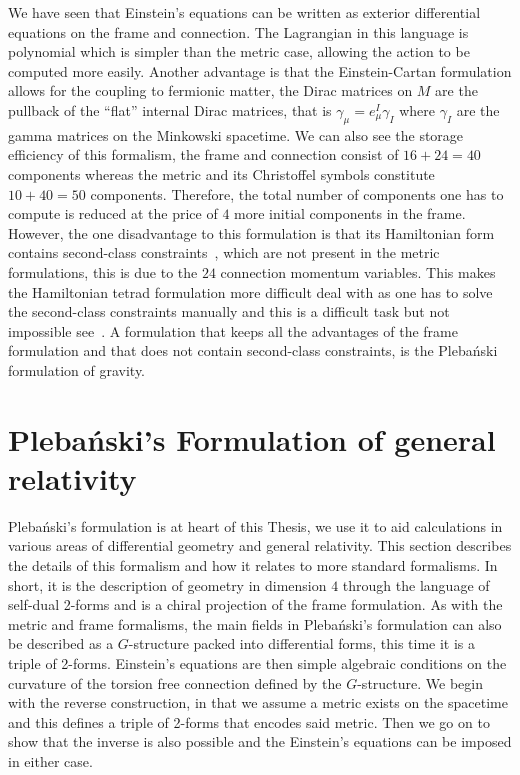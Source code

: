 \documentclass[10pt]{report}
\newcommand{\pleb}[0]{Pleba\'nski}
\theoremstyle{definition}
\begin{document}
We have seen that Einstein's equations can be written as exterior differential equations on the frame and connection. The Lagrangian in this language is polynomial which is simpler than the metric case, allowing the action to be computed more easily. Another advantage is that the Einstein-Cartan formulation allows for the coupling to fermionic matter, the Dirac matrices on $M$ are the pullback of the ``flat'' internal Dirac matrices, that is $\gamma_\mu = e^I_\mu \gamma_I$ where $\gamma_I$ are the gamma matrices on the Minkowski spacetime. We can also see the storage efficiency of this formalism, the frame and connection consist of $16+24 = 40$ components whereas the metric and its Christoffel symbols constitute $10+40 = 50$ components. Therefore, the total number of components one has to compute is reduced at the price of $4$ more initial components in the frame. However, the one disadvantage to this formulation is that its Hamiltonian form contains second-class constraints~\cite{First_order_gra_Alexan_2014}, which are not present in the metric formulations, this is due to the $24$ connection momentum variables. This makes the Hamiltonian tetrad formulation more difficult deal with as one has to solve the second-class constraints manually and this is a difficult task but not impossible see~\cite{Actions_for_Gra_Peldan_1993}. A formulation that keeps all the advantages of the frame formulation and that does not contain second-class constraints, is the \pleb{} formulation of gravity.


    \newpage
\chapter{\pleb{}'s Formulation of general relativity}\label{chap:plebanskis-formulation}
\pleb{}'s formulation is at heart of this Thesis, we use it to aid calculations in various areas of differential geometry and general relativity. This section describes the details of this formalism and how it relates to more standard formalisms. In short, it is the description of geometry in dimension $4$ through the language of self-dual 2-forms and is a chiral projection of the frame formulation. As with the metric and frame formalisms, the main fields in \pleb{}'s formulation can also be described as a $G$-structure packed into differential forms, this time it is a triple of 2-forms. Einstein's equations are then simple algebraic conditions on the curvature of the torsion free connection defined by the $G$-structure. We begin with the reverse construction, in that we assume a metric exists on the spacetime and this defines a triple of 2-forms that encodes said metric. Then we go on to show that the inverse is also possible and the Einstein's equations can be imposed in either case.
\end{document}
